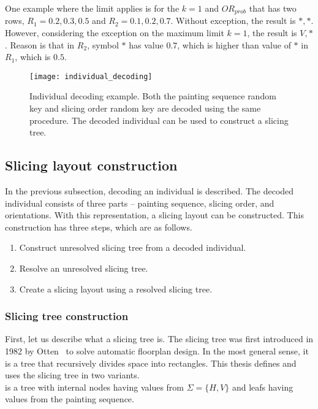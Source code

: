 One example where the limit applies is for the $k=1$ and $OR_{prob}$ that has two rows, $R_1 = 0.2, 0.3, 0.5$ and $R_2 = 0.1, 0.2, 0.7$.
Without exception, the result is $*, *$.
However, considering the exception on the maximum limit $k=1$, the result is $V, *$.
Reason is that in $R_2$, symbol $*$ has value $0.7$,
which is higher than value of $*$ in $R_1$, which is $0.5$.

\begin{figure}[h!]
    \texttt{[image: individual\_decoding]}
    \caption{
        Individual decoding example. Both the painting sequence random key and slicing order random key
        are decoded using the same procedure. The decoded individual can be used to construct a slicing tree.
    }
    \label{fig:individual-decoding}
\end{figure}

\subsection{Slicing layout construction}\label{subsec:slicing-tree-construction}
In the previous subsection, decoding an individual is described.
The decoded individual consists of three parts – painting sequence, slicing order, and orientations.
With this representation, a slicing layout can be constructed.
This construction has three steps, which are as follows.

\begin{enumerate}
    \item Construct unresolved slicing tree from a decoded individual.
    \item Resolve an unresolved slicing tree.
    \item Create a slicing layout using a resolved slicing tree.
\end{enumerate}

\subsubsection*{Slicing tree construction}

First, let us describe what a slicing tree is.
The slicing tree was first introduced in 1982 by Otten~\cite{ottenAutomaticFloorplanDesign1982} to solve automatic floorplan design.
In the most general sense, it is a tree that recursively divides space into rectangles.
This thesis defines and uses the slicing tree in two variants.\\

 is a tree with internal nodes having values from $\Sigma = \{H, V\}$
and leafs having values from the painting sequence.\\

